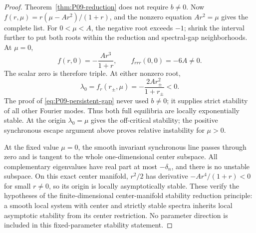 \begin{proof}
Theorem~\ref{thm:P09-reduction} does not require $b\ne0$. Now
$f(r,\mu)=r(\mu-Ar^2)/(1+r)$, and the nonzero equation $Ar^2=\mu$
gives the complete list. For $0<\mu<A$, the negative root exceeds
$-1$; shrink the interval further to put both roots within the
reduction and spectral-gap neighborhoods. At $\mu=0$,
\begin{equation}
 f(r,0)=-\frac{Ar^3}{1+r},\qquad f_{rrr}(0,0)=-6A\ne0.
 \label{eq:P09-cubic}
\end{equation}
The scalar zero is therefore triple. At either nonzero root,
\begin{equation}
 \lambda_0=f_r(r_\pm,\mu)=-\frac{2Ar_\pm^2}{1+r_\pm}<0.
 \label{eq:P09-degenerate-eigenvalue}
\end{equation}
The proof of \eqref{eq:P09-persistent-gap} never used $b\ne0$;
it supplies strict stability of all other Fourier modes. Thus both
full equilibria are locally exponentially stable. At the origin
$\lambda_0=\mu$ gives the off-critical stability; the positive
synchronous escape argument above proves relative instability for
$\mu>0$.

At the fixed value $\mu=0$, the smooth invariant synchronous line
passes through zero and is tangent to the whole one-dimensional center
subspace. All complementary eigenvalues have real part at most
$-\delta_n$, and there is no unstable subspace. On this exact center
manifold, $r^2/2$ has derivative $-Ar^4/(1+r)<0$ for small $r\ne0$,
so its origin is locally asymptotically stable. These verify the
hypotheses of the finite-dimensional center-manifold stability
reduction principle: a smooth local system with center and strictly
stable spectra inherits local asymptotic stability from its center
restriction. No parameter direction is included in this fixed-parameter
stability statement.


\end{proof}
